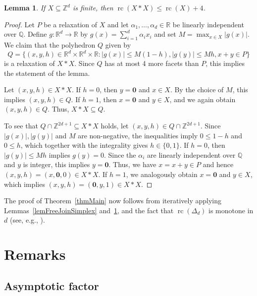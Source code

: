 \documentclass[11pt]{article}
\newcommand{\rc}{\operatorname{rc}}
\newcommand{\R}{\mathbb{R}}
\newcommand{\Q}{\mathbb{Q}}
\newcommand{\Z}{\mathbb{Z}}
\newcommand{\zero}{\mathbf{0}}
\newtheorem{lemma}[theorem]{Lemma}
\begin{document}
\begin{lemma}
    \label{lemFreeJoinRelaxation}
    If $X \subseteq \Z^d$ is finite, then $\rc(X \ast X ) \le \rc(X) + 4$.
\end{lemma}
\begin{proof}
    Let $P$ be a relaxation of $X$ and let $\alpha_1, \dots, \alpha_d \in \R$ be linearly independent over $\Q$.
    Define $g : \R^d \to \R$ by $g(x) = \sum_{i=1}^d \alpha_i x_i$ and set $M = \max_{x \in X} |g(x)|$.
    We claim that the polyhedron $Q$ given by
    \[
        Q = \{(x,y,h) \in \R^d \times \R^d \times \R : |g(x)| \le M (1-h), |g(y)| \le M h, x + y \in P\}
    \]
    is a relaxation of $X \ast X$.
    Since $Q$ has at most 4 more facets than $P$, this implies the statement of the lemma.

    Let $(x,y,h) \in X \ast X$. If $h = 0$, then $y = \zero$ and $x \in X$.
    By the choice of $M$, this implies $(x,y,h) \in Q$. 
    If $h = 1$, then $x = \zero$ and $y \in X$, and we again obtain $(x,y,h) \in Q$.
    Thus, $X \ast X \subseteq Q$.

    To see that $Q \cap \Z^{2d+1} \subseteq X \ast X$ holds, let $(x,y,h) \in Q \cap \Z^{2d+1}$.
    Since $|g(x)|, |g(y)|$ and $M$ are non-negative, the inequalities imply $0 \le 1 - h$ and $0 \le h$, which together with the integrality gives $h \in \{0,1\}$. If $h = 0$, then $|g(y)| \le M h$ implies $g(y) = 0$.
    Since the $\alpha_i$ are linearly independent over $\Q$ and $y$ is integer, this implies $y = \zero$.
    Thus, we have $x = x + y \in P$ and hence $(x,y,h) = (x, \zero, 0) \in X \ast X$.
    If $h = 1$, we analogously obtain $x = \zero$ and $y \in X$, which implies $(x,y,h) = (\zero, y, 1) \in X \ast X$.
\end{proof}

The proof of Theorem~\ref{thmMain} now follows from iteratively applying Lemmas~\ref{lemFreeJoinSimplex} and~\ref{lemFreeJoinRelaxation}, and the fact that $\rc(\Delta_d)$ is monotone in $d$ (see, e.g., \cite[Prop.~2]{Aprile2024}).

\section{Remarks}

\subsection{Asymptotic factor}
\end{document}
